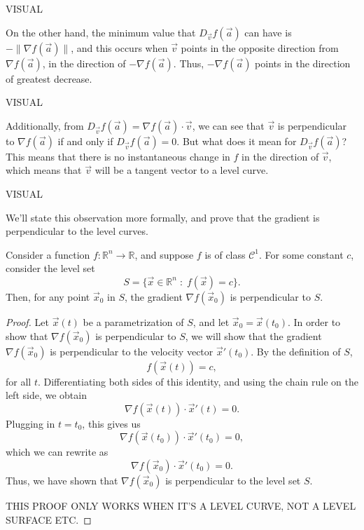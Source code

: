 \documentclass{ximera}
\begin{document}
VISUAL

On the other hand, the minimum value that $D_{\vec{v}}f(\vec{a})$ can have is $-\|\nabla f(\vec{a})\|$, and this occurs when $\vec{v}$ points in the opposite direction from $\nabla f(\vec{a})$, in the direction of $-\nabla f(\vec{a})$. Thus, $-\nabla f(\vec{a})$ points in the direction of greatest decrease.

VISUAL

Additionally, from $D_{\vec{v}}f(\vec{a}) = \nabla f(\vec{a})\cdot \vec{v}$, we can see that  $\vec{v}$ is perpendicular to $\nabla f(\vec{a})$ if and only if $D_{\vec{v}}f(\vec{a})=0$. But what does it mean for $D_{\vec{v}}f(\vec{a})$? This means that there is no instantaneous change in $f$ in the direction of $\vec{v}$, which means that $\vec{v}$ will be a tangent vector to a level curve.

VISUAL

We'll state this observation more formally, and prove that the gradient is perpendicular to the level curves.

\begin{theorem}
Consider a function $f:\mathbb{R}^n\rightarrow\mathbb{R}$, and suppose $f$ is of class $\mathcal{C}^1$. For some constant $c$, consider the level set
\[
S = \{\vec{x}\in\mathbb{R}^n\;:\;f(\vec{x})=c\}.
\]
Then, for any point $\vec{x}_0$ in $S$, the gradient $\nabla f(\vec{x}_0)$ is perpendicular to $S$.
\end{theorem} 

\begin{proof}
Let $\vec{x}(t)$ be a parametrization of $S$, and let $\vec{x}_0=\vec{x}(t_0)$. In order to show that $\nabla f(\vec{x}_0)$ is perpendicular to $S$, we will show that the gradient $\nabla f(\vec{x}_0)$ is perpendicular to the velocity vector $\vec{x}'(t_0)$. By the definition of $S$,
\[
f(\vec{x}(t))=c,
\]
for all $t$. Differentiating both sides of this identity, and using the chain rule on the left side, we obtain
\[
\nabla f(\vec{x}(t))\cdot \vec{x}'(t) = 0.
\]
Plugging in $t=t_0$, this gives us
\[
\nabla f(\vec{x}(t_0))\cdot \vec{x}'(t_0) = 0,
\]
which we can rewrite as
\[
\nabla f(\vec{x}_0)\cdot \vec{x}'(t_0) = 0.
\]
Thus, we have shown that $\nabla f(\vec{x}_0)$ is perpendicular to the level set $S$.

THIS PROOF ONLY WORKS WHEN IT'S A LEVEL CURVE, NOT A LEVEL SURFACE ETC.
\end{proof}
\end{document}
